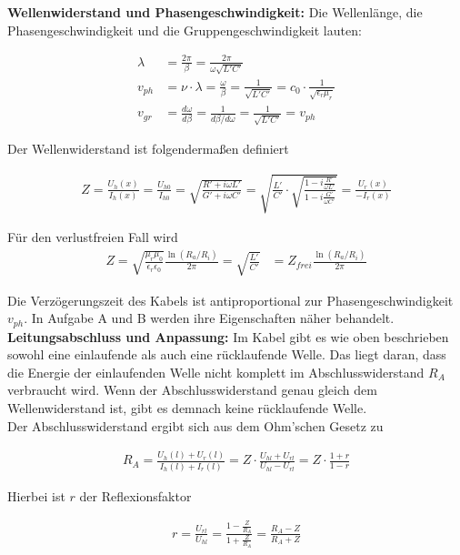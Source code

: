 \textbf{Wellenwiderstand und Phasengeschwindigkeit:} Die Wellenlänge, die Phasengeschwindigkeit und die Gruppengeschwindigkeit lauten:

\begin{align}
    \lambda &= \frac{2\pi}{\beta} = \frac{2\pi}{\omega \sqrt{L'C'}} \\
    v_{ph} &= \nu \cdot \lambda = \frac{\omega}{\beta} = \frac{1}{\sqrt{L'C'}} = c_0 \cdot \frac{1}{\sqrt{\epsilon _r \mu _r}}\\
    v_{gr} &= \frac{d\omega}{d\beta} = \frac{1}{d\beta / d\omega} = \frac{1}{\sqrt{L'C'}} = v_{ph}
\end{align}

Der Wellenwiderstand ist folgendermaßen definiert

\begin{align}
    Z = \frac{U_h(x)}{I_h(x)} = \frac{U_{h0}}{I_{h0}} = \sqrt{\frac{R'+i\omega L'}{G'+i\omega C'}} = \sqrt{\frac{L'}{C'} \cdot \sqrt{\frac{1-i\frac{R'}{\omega L'}}{1- i\frac{G'}{\omega C'}}}} = \frac{U_r(x)}{-I_r(x)}
\end{align}

Für den verlustfreien Fall wird
\begin{align}
    Z = \sqrt{\frac{\mu_r \mu_0}{\epsilon_r \epsilon_0}} \frac{\ln(R_a / R_i)}{2 \pi} = \sqrt{\frac{L'}{C'}} &= Z_{frei} \frac{\ln(R_a / R_i)}{2 \pi}
\end{align}

Die Verzögerungszeit des Kabels ist antiproportional zur Phasengeschwindigkeit $v_{ph}$. In Aufgabe A und B werden ihre Eigenschaften näher behandelt. \\

\textbf{Leitungsabschluss und Anpassung:} Im Kabel gibt es wie oben beschrieben sowohl eine einlaufende als auch eine rücklaufende Welle. Das liegt daran, dass die Energie der einlaufenden Welle nicht komplett im Abschlusswiderstand $ R_A $ verbraucht wird. Wenn der Abschlusswiderstand genau gleich dem Wellenwiderstand ist, gibt es demnach keine rücklaufende Welle.\\
Der Abschlusswiderstand ergibt sich aus dem Ohm'schen Gesetz zu

\begin{align}
    R_A = \frac{U_h(l)+U_r(l)}{I_h(l)+I_r(l)} = Z \cdot \frac{U_{hl}+U_{rl}}{U_{hl}-U_{rl}} = Z \cdot \frac{1+r}{1-r}
\end{align}

Hierbei ist $r$ der Reflexionsfaktor

\begin{align}
    r = \frac{U_{rl}}{U_{hl}} = \frac{1-\frac{Z}{R_A}}{1+\frac{Z}{R_A}} = \frac{R_A-Z}{R_A+Z}
\end{align}

